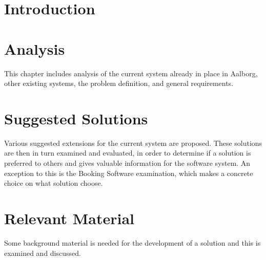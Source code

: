
\usepackage[disable]{todonotes}					%
\newcommand{\bycykelwithoutspace}{Aalborg Bycykel}
\newcommand{\bycykel}{\bycykelwithoutspace{ }}


	
	\newpage\null\thispagestyle{empty}\newpage
	
	\addtocounter{page}{4}
	\newpage\null\thispagestyle{empty}\newpage
	
	\newpage\null\thispagestyle{empty}\newpage
	
	\label{startoftoc}
	\begin{KeepFromToc}
		\tableofcontents
		\newpage\null\thispagestyle{empty}\newpage
		\newpage\null\thispagestyle{empty}\newpage
		\todototoc
		\listoftodos
	\end{KeepFromToc}
	\label{endoftoc}
	
	\chapter{Introduction}
	
	\chapter{Analysis}
	This chapter includes analysis of the current system already in place in Aalborg, other existing systems, the problem definition, and general requirements.
	
	
	
	
	
	
	\chapter{Suggested Solutions}
	Various suggested extensions for the current system are proposed.
	These solutions are then in turn examined and evaluated, in order to determine if a solution is preferred to others and gives valuable information for the software system.
	An exception to this is the Booking Software examination, which makes a concrete choice on what solution choose.
	
	
	
	
	
	
	\chapter{Relevant Material}
	Some background material is needed for the development of a solution and this is examined and discussed.
	
	
	
	
	
